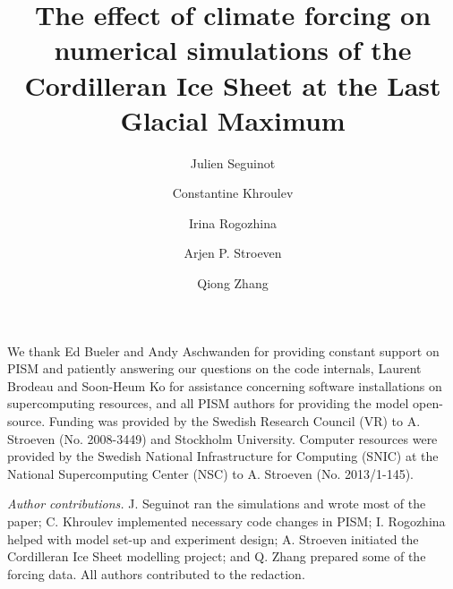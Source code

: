 \documentclass[tc, ms]{copernicus}
\begin{document}

\title{The effect of climate forcing on numerical simulations of the Cordilleran Ice Sheet at the Last Glacial Maximum}

\author[1]{Julien Seguinot}
\author[2]{Constantine Khroulev}
\author[3]{Irina Rogozhina}
\author[1]{Arjen P. Stroeven}
\author[1]{Qiong Zhang}


\received{}
\pubdiscuss{}
\revised{}
\accepted{}
\published{}

\maketitle









\begin{acknowledgements}
We thank Ed Bueler and Andy Aschwanden for providing constant support on PISM and patiently answering our questions on the code internals, Laurent Brodeau and Soon-Heum Ko for assistance concerning software installations on supercomputing resources, and all PISM authors for providing the model open-source. Funding was provided by the Swedish Research Council (VR) to A. Stroeven (No. 2008-3449) and Stockholm University. Computer resources were provided by the Swedish National Infrastructure for Computing (SNIC) at the National Supercomputing Center (NSC) to A. Stroeven (No. 2013/1-145). 

\textit{Author contributions.}
J. Seguinot ran the simulations and wrote most of the paper; C. Khroulev implemented necessary code changes in PISM; I. Rogozhina helped with model set-up and experiment design; A. Stroeven initiated the Cordilleran Ice Sheet modelling project; and Q. Zhang prepared some of the forcing data. All authors contributed to the redaction.
\end{acknowledgements}




\newpage



\end{document}
